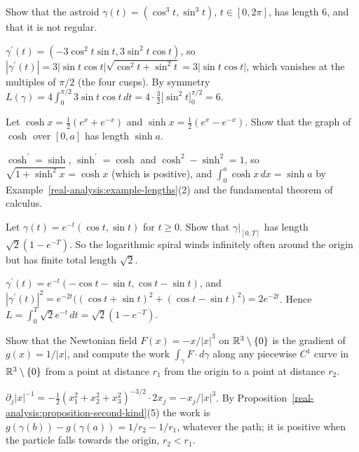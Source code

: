 \begin{exercise}\label{real-analysis:exercise-astroid}
Show that the astroid $\gamma(t) = (\cos^3t, \sin^3t)$, $t \in [0, 2\pi]$, has length $6$, and that it is not regular.
\end{exercise}

\begin{solution}
$\gamma^{\prime}(t) = (-3\cos^2t\sin t, 3\sin^2t\cos t)$, so $|\gamma^{\prime}(t)| = 3|\sin t\cos t|\sqrt{\cos^2t + \sin^2t} = 3|\sin t\cos t|$, which vanishes at the multiples of $\pi/2$ (the four cusps). By symmetry
$L(\gamma) = 4\int_0^{\pi/2}3\sin t\cos t\,dt = 4 \cdot \frac32\bigl[\sin^2t\bigr]_0^{\pi/2} = 6$.
\end{solution}

\begin{exercise}\label{real-analysis:exercise-catenary}
Let $\cosh x = \frac12(e^x + e^{-x})$ and $\sinh x = \frac12(e^x - e^{-x})$. Show that the graph of $\cosh$ over $[0, a]$ has length $\sinh a$.
\end{exercise}

\begin{solution}
$\cosh^{\prime} = \sinh$, $\sinh^{\prime} = \cosh$ and $\cosh^2 - \sinh^2 = 1$, so $\sqrt{1 + \sinh^2x} = \cosh x$ (which is positive), and $\int_0^a\cosh x\,dx = \sinh a$ by
Example~\ref{real-analysis:example-lengths}(2) and the fundamental theorem of calculus.
\end{solution}

\begin{exercise}\label{real-analysis:exercise-log-spiral}
Let $\gamma(t) = e^{-t}(\cos t, \sin t)$ for $t \geq 0$. Show that $\gamma|_{[0, T]}$ has length $\sqrt2(1 - e^{-T})$. So the logarithmic spiral winds infinitely often around the origin but has finite total
length $\sqrt2$.
\end{exercise}

\begin{solution}
$\gamma^{\prime}(t) = e^{-t}(-\cos t - \sin t, \cos t - \sin t)$, and $|\gamma^{\prime}(t)|^2 = e^{-2t}\bigl((\cos t + \sin t)^2 + (\cos t - \sin t)^2\bigr) = 2e^{-2t}$. Hence
$L = \int_0^T\sqrt2e^{-t}\,dt = \sqrt2(1 - e^{-T})$.
\end{solution}

\begin{exercise}\label{real-analysis:exercise-newton-work}
Show that the Newtonian field $F(x) = -x/|x|^3$ on $\mathbb{R}^3 \setminus \{0\}$ is the gradient of $g(x) = 1/|x|$, and compute the work $\int_\gamma F \cdot d\gamma$ along any piecewise $C^1$ curve in $\mathbb{R}^3 \setminus \{0\}$
from a point at distance $r_1$ from the origin to a point at distance $r_2$.
\end{exercise}

\begin{solution}
$\partial_j|x|^{-1} = -\frac12(x_1^2 + x_2^2 + x_3^2)^{-3/2} \cdot 2x_j = -x_j/|x|^3$. By Proposition~\ref{real-analysis:proposition-second-kind}(5) the work is $g(\gamma(b)) - g(\gamma(a)) = 1/r_2 - 1/r_1$, whatever
the path; it is positive when the particle falls towards the origin, $r_2 < r_1$.
\end{solution}
